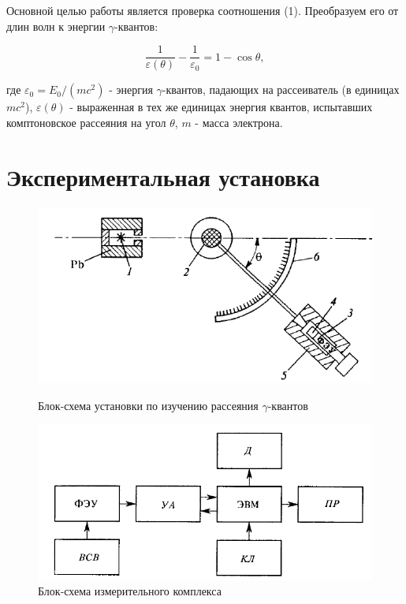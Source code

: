 \documentclass[a4paper,12pt]{article} %
\begin{document}
 \medskip

\noindent Основной целью работы является проверка соотношения (1). Преобразуем его от длин волн к энергии $\gamma$-квантов:

\begin{equation}
    \frac{1}{\varepsilon(\theta)} - \frac{1}{\varepsilon_0} = 1 - \cos \theta,
\end{equation}

\noindent где $\varepsilon_0 = E_0/(mc^2)$ - энергия $\gamma$-квантов, падающих на рассеиватель (в единицах $mc^2$), $\varepsilon(\theta)$ - выраженная в тех же единицах энергия квантов, испытавших комптоновское рассеяния на угол $\theta$, $m$ - масса электрона.

\newpage

\section{Экспериментальная установка}

  \begin{figure}[h!]
\begin{center}
\begin{minipage}[h!]{0.48\linewidth}
\includegraphics[width=1\linewidth]{fig2.PNG}
\caption{Блок-схема установки по изучению рассеяния $\gamma$-квантов} %
\end{minipage}
\hfill 
\begin{minipage}[h!]{0.48\linewidth}
\includegraphics[width=1\linewidth]{fig3.PNG}
\caption{Блок-схема измерительного комплекса}
\label{ris:experimcoded}
\end{minipage}
\end{center}
\end{figure}
\end{document}
